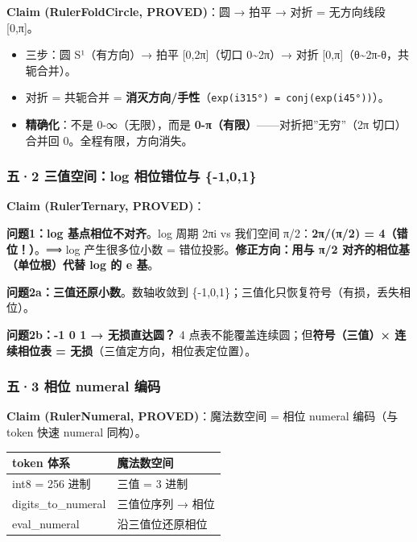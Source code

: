 \documentclass[
]{article}
\providecommand{\tightlist}{%
  \setlength{\itemsep}{0pt}\setlength{\parskip}{0pt}}
\begin{document}
\textbf{Claim (RulerFoldCircle, PROVED)}：圆 → 拍平 → 对折 = 无方向线段
{[}0,π{]}。

\begin{itemize}
\tightlist
\item
  三步：圆 S¹（有方向）→ 拍平 {[}0,2π{]}（切口 0\textasciitilde2π）→
  对折 {[}0,π{]}（θ\textasciitilde2π-θ，共轭合并）。
\item
  对折 = 共轭合并 =
  \textbf{消灭方向/手性}（\texttt{exp(i315°)\ =\ conj(exp(i45°))}）。
\item
  \textbf{精确化}：不是 0-∞（无限），而是
  \textbf{0-π（有限）}------对折把''无穷''（2π 切口）合并回
  0。全程有限，方向消失。
\end{itemize}

\subsubsection{五·2 三值空间：log 相位错位与
\{-1,0,1\}}\label{ux4e942-ux4e09ux503cux7a7aux95f4log-ux76f8ux4f4dux9519ux4f4dux4e0e--101}

\textbf{Claim (RulerTernary, PROVED)}：

\textbf{问题1：log 基点相位不对齐}。log 周期 2πi vs 我们空间
π/2：\textbf{2π/(π/2) = 4（错位！）}。⟹ log 产生很多位小数 =
错位投影。\textbf{修正方向：用与 π/2 对齐的相位基（单位根）代替 log 的 e
基}。

\textbf{问题2a：三值还原小数}。数轴收敛到
\{-1,0,1\}；三值化只恢复符号（有损，丢失相位）。

\textbf{问题2b：-1 0 1 → 无损直达圆？} 4
点表不能覆盖连续圆；但\textbf{符号（三值）× 连续相位表 =
无损}（三值定方向，相位表定位置）。

\subsubsection{五·3 相位 numeral
编码}\label{ux4e943-ux76f8ux4f4d-numeral-ux7f16ux7801}

\textbf{Claim (RulerNumeral, PROVED)}：魔法数空间 = 相位 numeral
编码（与 token 快速 numeral 同构）。

\begin{longtable}[]{@{}ll@{}}
\toprule\noalign{}
token 体系 & 魔法数空间 \\
\midrule\noalign{}
\endhead
\bottomrule\noalign{}
\endlastfoot
int8 = 256 进制 & 三值 = 3 进制 \\
digits\_to\_numeral & 三值位序列 → 相位 \\
eval\_numeral & 沿三值位还原相位 \\
\end{longtable}
\end{document}
